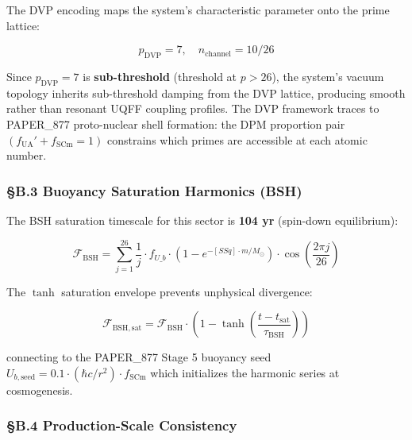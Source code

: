 The DVP encoding maps the system's characteristic parameter onto the
prime lattice:

\[p_{\mathrm{DVP}} = 7, \quad n_{\mathrm{channel}} = 10/26\]

Since \(p_{\mathrm{DVP}} = 7\) is \textbf{sub-threshold} (threshold at
\(p > 26\)), the system's vacuum topology inherits sub-threshold damping
from the DVP lattice, producing smooth rather than resonant UQFF
coupling profiles. The DVP framework traces to PAPER\_877 proto-nuclear
shell formation: the DPM proportion pair
\((f_{\mathrm{UA}}' + f_{\mathrm{SCm}} = 1)\) constrains which primes
are accessible at each atomic number.

\subsubsection{§B.3 Buoyancy Saturation Harmonics
(BSH)}\label{b.3-buoyancy-saturation-harmonics-bsh}

The BSH saturation timescale for this sector is \textbf{104 yr}
(spin-down equilibrium):

\[\mathcal{F}_{\mathrm{BSH}} = \sum_{j=1}^{26} \frac{1}{j} \cdot f_{U\_b} \cdot \left(1 - e^{-[SSq] \cdot m/M_\odot}\right) \cdot \cos\!\left(\frac{2\pi j}{26}\right)\]

The \(\tanh\) saturation envelope prevents unphysical divergence:

\[\mathcal{F}_{\mathrm{BSH,sat}} = \mathcal{F}_{\mathrm{BSH}} \cdot \left(1 - \tanh\!\left(\frac{t - t_{\mathrm{sat}}}{\tau_{\mathrm{BSH}}}\right)\right)\]

connecting to the PAPER\_877 Stage 5 buoyancy seed
\(U_{b,\mathrm{seed}} = 0.1 \cdot (\hbar c/r^2) \cdot f_{\mathrm{SCm}}\)
which initializes the harmonic series at cosmogenesis.

\subsubsection{§B.4 Production-Scale
Consistency}\label{b.4-production-scale-consistency}

